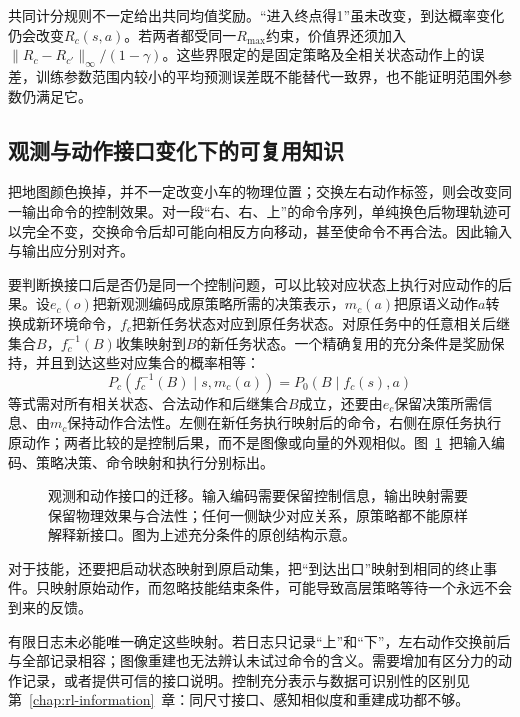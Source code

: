共同计分规则不一定给出共同均值奖励。“进入终点得1”虽未改变，到达概率变化仍会改变$R_c(s,a)$。若两者都受同一$R_{\max}$约束，价值界还须加入$\lVert R_c-R_{c'}\rVert_\infty/(1-\gamma)$。这些界限定的是固定策略及全相关状态动作上的误差，训练参数范围内较小的平均预测误差既不能替代一致界，也不能证明范围外参数仍满足它。

\subsection{观测与动作接口变化下的可复用知识}
\label{sec:rl-transfer-interface}

把地图颜色换掉，并不一定改变小车的物理位置；交换左右动作标签，则会改变同一输出命令的控制效果。对一段“右、右、上”的命令序列，单纯换色后物理轨迹可以完全不变，交换命令后却可能向相反方向移动，甚至使命令不再合法。因此输入与输出应分别对齐。

要判断换接口后是否仍是同一个控制问题，可以比较对应状态上执行对应动作的后果。设$e_c(o)$把新观测编码成原策略所需的决策表示，$m_c(a)$把原语义动作$a$转换成新环境命令，$f_c$把新任务状态对应到原任务状态。对原任务中的任意相关后继集合$B$，$f_c^{-1}(B)$收集映射到$B$的新任务状态。一个精确复用的充分条件是奖励保持，并且到达这些对应集合的概率相等：
\[
 P_c\!\left(f_c^{-1}(B)\mid s,m_c(a)\right)
 =P_0\!\left(B\mid f_c(s),a\right)
\]
等式需对所有相关状态、合法动作和后继集合$B$成立，还要由$e_c$保留决策所需信息、由$m_c$保持动作合法性。左侧在新任务执行映射后的命令，右侧在原任务执行原动作；两者比较的是控制后果，而不是图像或向量的外观相似。图~\ref{fig:rl-transfer-interface}~把输入编码、策略决策、命令映射和执行分别标出。

\begin{figure}[t]
  \centering
  
  \caption{观测和动作接口的迁移。输入编码需要保留控制信息，输出映射需要保留物理效果与合法性；任何一侧缺少对应关系，原策略都不能原样解释新接口。图为上述充分条件的原创结构示意。}
  \label{fig:rl-transfer-interface}
\end{figure}

对于技能，还要把启动状态映射到原启动集，把“到达出口”映射到相同的终止事件。只映射原始动作，而忽略技能结束条件，可能导致高层策略等待一个永远不会到来的反馈。

有限日志未必能唯一确定这些映射。若日志只记录“上”和“下”，左右动作交换前后与全部记录相容；图像重建也无法辨认未试过命令的含义。需要增加有区分力的动作记录，或者提供可信的接口说明。控制充分表示与数据可识别性的区别见第~\ref{chap:rl-information}~章：同尺寸接口、感知相似度和重建成功都不够。

